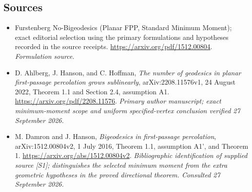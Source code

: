 \documentclass[11pt]{article}
\begin{document}
\subsection{Sources}
\begin{itemize}
\item[S1]Furstenberg No-Bigeodesics (Planar FPP, Standard Minimum Moment); exact editorial selection using the primary formulations and hypotheses recorded in the source receipts.
\url{https://arxiv.org/pdf/1512.00804}.
\textit{Formulation source.}
\item[E1] D. Ahlberg, J. Hanson, and C. Hoffman,
\emph{The number of geodesics in planar first-passage percolation grows
sublinearly}, arXiv:2208.11576v1, 24 August 2022,
Theorem 1.1 and Section 2.4, assumption A1.
\url{https://arxiv.org/pdf/2208.11576}.
\textit{Primary author manuscript; exact minimum-moment scope and uniform
specified-vertex conclusion verified 27 September 2026.}
\item[E2] M. Damron and J. Hanson, \emph{Bigeodesics in first-passage
percolation}, arXiv:1512.00804v2, 1 July 2016,
Theorem 1.1, assumption A1', and Theorem 1.
\url{https://arxiv.org/abs/1512.00804v2}.
\textit{Bibliographic identification of supplied source [S1]; distinguishes
the selected minimum moment from the extra geometric hypotheses in the
proved directional theorem. Consulted 27 September 2026.}
\end{itemize}
\end{document}
